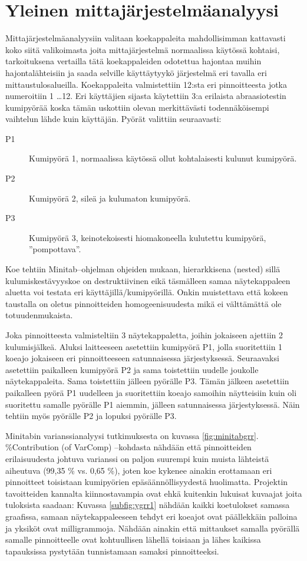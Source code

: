 \documentclass[12pt,a4paper,finnish]{tutthesis}
\begin{document}
\section{Yleinen mittajärjestelmäanalyysi}

Mittajärjestelmäanalyysiin valitaan koekappaleita mahdollisimman kattavasti koko siitä valikoimasta joita mittajärjestelmä normaalissa käytössä kohtaisi, tarkoituksena vertailla tätä koekappaleiden odotettua hajontaa muihin hajontalähteisiin ja saada selville käyttäytyykö järjestelmä eri tavalla eri mittaustulosalueilla. Koekappaleita valmistettiin 12:sta eri pinnoitteesta jotka
numeroitiin 1 \ldots 12.
Eri käyttäjien sijasta käytettiin 3:a erilaista abraasiotestin kumipyörää koska tämän
uskottiin olevan merkittävästi todennäköisempi vaihtelun lähde kuin käyttäjän. Pyörät
valittiin seuraavasti:

\begin{description}
  \item[P1] Kumipyörä 1, normaalissa käytössä ollut kohtalaisesti kulunut kumipyörä.
  \item[P2] Kumipyörä 2, sileä ja kulumaton kumipyörä.
  \item[P3] Kumipyörä 3, keinotekoisesti hiomakoneella kulutettu kumipyörä, ”pompottava”.
\end{description}

Koe tehtiin Minitab–ohjelman ohjeiden mukaan, hierarkkisena (nested) sillä kulumiskestävyyskoe on destruktiivinen eikä täsmälleen samaa näytekappaleen aluetta voi testata eri käyttäjillä/kumipyörillä. Onkin muistettava että kokeen taustalla on oletus pinnoitteiden homogeenisuudesta mikä ei välttämättä ole totuudenmukaista.

Joka pinnoitteesta valmisteltiin 3 näytekappaletta, joihin jokaiseen ajettiin 2 kulumisjälkeä. Aluksi laitteeseen asetettiin kumipyörä P1, jolla suoritettiin 1 koeajo jokaiseen eri pinnoitteeseen satunnaisessa järjestyksessä. Seuraavaksi asetettiin paikalleen kumipyörä P2 ja sama toistettiin uudelle joukolle näytekappaleita. Sama toistettiin jälleen pyörälle P3. Tämän jälkeen asetettiin paikalleen pyörä P1 uudelleen ja suoritettiin koeajo samoihin näytteisiin kuin oli suoritettu samalle pyörälle P1 aiemmin, jälleen satunnaisessa järjestyksessä. Näin tehtiin myös pyörälle P2 ja lopuksi pyörälle P3.

Minitabin varianssianalyysi tutkimuksesta on kuvassa \ref{fig:minitabgrr}.
\%Contribution (of VarComp) –kohdasta nähdään että pinnoitteiden erilaisuudesta johtuva varianssi on paljon suurempi kuin muista lähteistä aiheutuva (99,35 \% vs. 0,65 \%), joten koe kykenee ainakin erottamaan eri pinnoitteet toisistaan kumipyörien epäsäännöllisyydestä huolimatta. Projektin tavoitteiden kannalta kiinnostavampia ovat ehkä kuitenkin lukuisat kuvaajat joita tuloksista saadaan: Kuvassa \ref{subfig:ygrr1} nähdään kaikki koetulokset samassa graafissa, samaan näytekappaleeseen tehdyt eri koeajot ovat päällekkäin palloina ja yksiköt ovat milligrammoja.
Nähdään ainakin että mittaukset samalla pyörällä samalle pinnoitteelle ovat kohtuullisen lähellä toisiaan ja lähes kaikissa tapauksissa pystytään tunnistamaan samaksi pinnoitteeksi.
\end{document}
